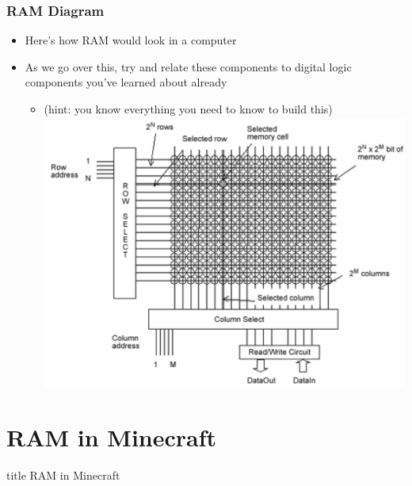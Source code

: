 \documentclass{beamer}
\begin{document}
             \begin{frame}
             	\frametitle{RAM Diagram}
             	\begin{itemize}
             		\item Here's how RAM would look in a computer
             		\item As we go over this, try and relate these components to digital logic components you've learned about already
             		\begin{itemize}
             			\item (hint: you know everything you need to know to build this)
             			{
             	\centering
             	\includegraphics[scale=0.15]{RAM.png} 
             	}
             		\end{itemize}             		             		
             		
             	\end{itemize}
             	
             	
             	
             	
             \end{frame}
             
		\section{RAM in Minecraft}
             
             \begin{frame}
                \vfill
                \centering
                \begin{beamercolorbox}[sep=8pt,center,shadow=true,rounded=true]{title}
                    RAM in Minecraft\par%
                \end{beamercolorbox}
                \vfill
             \end{frame}
             
\end{document}
